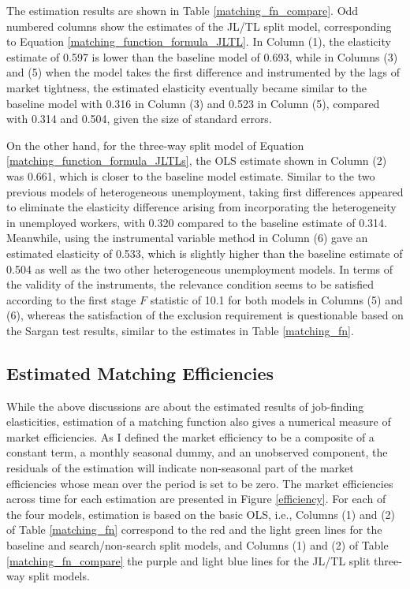 \documentclass[a4paper, 11pt, tikz]{article}
\begin{document}
The estimation results are shown in Table \ref{matching_fn_compare}.
Odd numbered columns show the estimates of the JL/TL split model, corresponding to Equation \ref{matching_function_formula_JLTL}.
In Column (1), the elasticity estimate of 0.597 is lower than the baseline model of 0.693, while in Columns (3) and (5) when the model takes the first difference and instrumented by the lags of market tightness, the estimated elasticity eventually became similar to the baseline model with 0.316 in Column (3) and 0.523 in Column (5), compared with 0.314 and 0.504, given the size of standard errors.



On the other hand, for the three-way split model of Equation \ref{matching_function_formula_JLTLs}, the OLS estimate shown in Column (2) was 0.661, which is closer to the baseline model estimate.
Similar to the two previous models of heterogeneous unemployment, taking first differences appeared to eliminate the elasticity difference arising from incorporating the heterogeneity in unemployed workers, with 0.320 compared to the baseline estimate of 0.314.
Meanwhile, using the instrumental variable method in Column (6) gave an estimated elasticity of 0.533, which is slightly higher than the baseline estimate of 0.504 as well as the two other heterogeneous unemployment models.
In terms of the validity of the instruments, the relevance condition seems to be satisfied according to the first stage $F$ statistic of 10.1 for both models in Columns (5) and (6), whereas the satisfaction of the exclusion requirement is questionable based on the Sargan test results, similar to the estimates in Table \ref{matching_fn}.

\subsection{Estimated Matching Efficiencies}
While the above discussions are about the estimated results of job-finding elasticities, estimation of a matching function also gives a numerical measure of market efficiencies.
As I defined the market efficiency to be a composite of a constant term, a monthly seasonal dummy, and an unobserved component, the residuals of the estimation will indicate non-seasonal part of the market efficiencies whose mean over the period is set to be zero.
The market efficiencies across time for each estimation are presented in Figure \ref{efficiency}.
For each of the four models, estimation is based on the basic OLS, i.e., Columns (1) and (2) of Table \ref{matching_fn} correspond to the red and the light green lines for the baseline and search/non-search split models, and Columns (1) and (2) of Table \ref{matching_fn_compare} the purple and light blue lines for the JL/TL split three-way split models.
\end{document}
